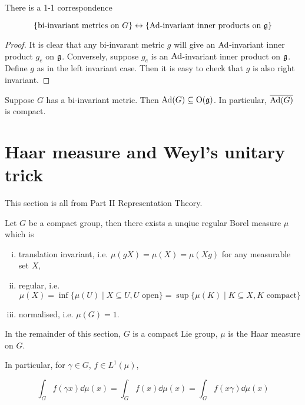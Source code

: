 \documentclass{article}
\begin{document}
\begin{proposition}
    There is a 1-1 correspondence

    \[\{\text{bi-invariant metrics on }G\} \leftrightarrow \{\text{\(\operatorname{Ad}\)-invariant inner products on }\mathfrak{g}\}\]
\end{proposition}

\begin{proof}
    It is clear that any bi-invarant metric \(g\) will give an \(\operatorname{Ad}\)-invariant inner product \(g_e\) on \(\mathfrak{g}\). Conversely, suppose \(g_e\) is an \(\operatorname{Ad}\)-invariant inner product on \(\mathfrak{g}\). Define \(g\) as in the left invariant case. Then it is easy to check that \(g\) is also right invariant.
\end{proof}

\begin{corollary}
    Suppose \(G\) has a bi-invariant metric. Then \(\operatorname{Ad}(G) \subseteq \mathrm{O}(\mathfrak{g})\). In particular, \(\overline{\operatorname{Ad}(G)}\) is compact.
\end{corollary}

\section{Haar measure and Weyl's unitary trick}

This section is all from Part II Representation Theory.

\begin{theorem}
     Let \(G\) be a compact group, then there exists a unqiue regular Borel measure \(\mu\) which is

    \begin{enumerate}[(i)]
        \item translation invariant, i.e. \(\mu(gX) = \mu(X) = \mu(Xg)\) for any measurable set \(X\),
        \item regular, i.e.
        \[\mu(X) = \inf\{\mu(U) \mid X \subseteq U, U \text{ open}\} = \sup\{\mu(K) \mid K \subseteq X, K \text{ compact}\}\]
        \item normalised, i.e. \(\mu(G) = 1\).
    \end{enumerate}
\end{theorem}

In the remainder of this section, \(G\) is a compact Lie group, \(\mu\) is the Haar measure on \(G\).

\begin{corollary}
    In particular, for \(\gamma \in G\), \(f \in L^1(\mu)\),

    \[\int_G f(\gamma x)\dd\mu(x) = \int_G f(x)\dd\mu(x) = \int_G f(x\gamma)\dd\mu(x)\]
\end{corollary}
\end{document}
